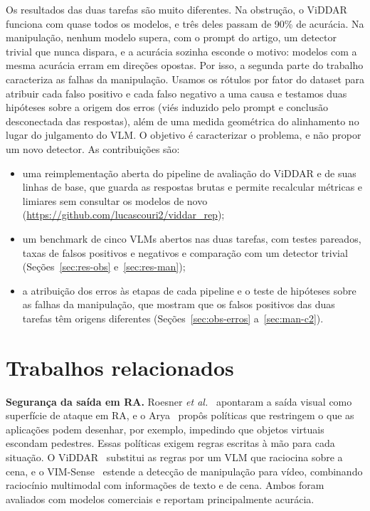 \documentclass[conference]{IEEEtran}
\begin{document}
Os resultados das duas tarefas são muito diferentes. Na obstrução, o ViDDAR funciona com quase todos os
modelos, e três deles passam de 90\% de acurácia. Na manipulação, nenhum modelo supera, com o prompt do
artigo, um detector trivial que nunca dispara, e a acurácia sozinha esconde o motivo: modelos com a
mesma acurácia erram em direções opostas. Por isso, a segunda parte do trabalho caracteriza as falhas da
manipulação. Usamos os rótulos por fator do dataset para atribuir cada falso positivo e cada falso
negativo a uma causa e testamos duas hipóteses sobre a origem dos erros (viés induzido pelo prompt e
conclusão desconectada das respostas), além de uma medida geométrica do alinhamento no lugar do
julgamento do VLM. O objetivo é caracterizar o problema, e não
propor um novo detector. As contribuições são:
\begin{itemize}
\item uma reimplementação aberta do pipeline de avaliação do ViDDAR e de suas linhas de base, que guarda
  as respostas brutas e permite recalcular métricas e limiares sem consultar os modelos de novo
  (\url{https://github.com/lucascouri2/viddar_rep});
\item um benchmark de cinco VLMs abertos nas duas tarefas, com testes pareados, taxas de falsos
  positivos e negativos e comparação com um detector trivial (Seções~\ref{sec:res-obs}
  e~\ref{sec:res-man});
\item a atribuição dos erros às etapas de cada pipeline e o teste de hipóteses sobre as falhas da
  manipulação, que mostram que os falsos positivos das duas tarefas têm origens diferentes
  (Seções~\ref{sec:obs-erros} a~\ref{sec:man-c2}).
\end{itemize}

\section{Trabalhos relacionados}
\label{sec:rel}

\textbf{Segurança da saída em RA.} Roesner \emph{et al.}~\cite{roesner2014} apontaram a saída visual
como superfície de ataque em RA, e o Arya~\cite{arya} propôs políticas que restringem o que as aplicações
podem desenhar, por exemplo, impedindo que objetos virtuais escondam pedestres. Essas políticas exigem
regras escritas à mão para cada situação. O ViDDAR~\cite{viddar} substitui as regras por um VLM que
raciocina sobre a cena, e o VIM-Sense~\cite{vimsense} estende a detecção de manipulação para vídeo,
combinando raciocínio multimodal com informações de texto e de cena. Ambos foram avaliados com modelos
comerciais e reportam principalmente acurácia.
\end{document}
